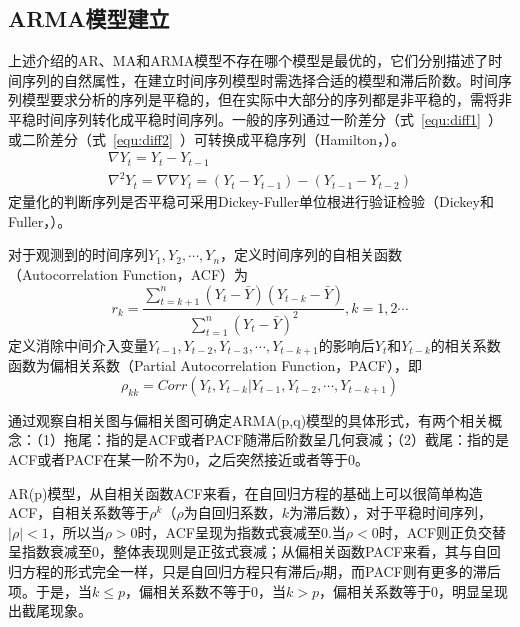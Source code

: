 \subsection{ARMA模型建立}
\label{chap:armamodelbuilding}

上述介绍的AR、MA和ARMA模型不存在哪个模型是最优的，它们分别描述了时间序列的自然属性，在建立时间序列模型时需选择合适的模型和滞后阶数。时间序列模型要求分析的序列是平稳的，但在实际中大部分的序列都是非平稳的，需将非平稳时间序列转化成平稳时间序列。一般的序列通过一阶差分（式~\ref{equ:diff1}~）或二阶差分（式~\ref{equ:diff2}~）可转换成平稳序列（Hamilton，\citeyear{hamilton1994time}）。
\begin{gather}
	\label{equ:diff1}
	\nabla {{Y}_{t}}={{Y}_{t}}-{{Y}_{t-1}} \\ 
	\label{equ:diff2}
	{{\nabla }^{2}}{{Y}_{t}}=\nabla \nabla {{Y}_{t}}=({{Y}_{t}}-{{Y}_{t-1}})-({{Y}_{t-1}}-{{Y}_{t-2}}) 
\end{gather}
定量化的判断序列是否平稳可采用Dickey-Fuller单位根进行验证检验（Dickey和Fuller，\citeyear{dickey1979distribution}）。

对于观测到的时间序列${{Y}_{1}},{{Y}_{2}},\cdots ,{{Y}_{n}}$，定义时间序列的自相关函数（Autocorrelation Function，ACF）为
\begin{equation}
	{{r}_{k}}=\frac{\sum\limits_{t=k+1}^{n}{({{Y}_{t}}-\bar{Y})({{Y}_{t-k}}-\bar{Y})}}{\sum\limits_{t=1}^{n}{{{({{Y}_{t}}-\bar{Y})}^{2}}}},k=1,2\cdots 
\end{equation}
定义消除中间介入变量${{Y}_{t-1}},{{Y}_{t-2}},{{Y}_{t-3}},\cdots ,{{Y}_{t-k+1}}$的影响后$Y_t$和$Y_{t-k}$的相关系数函数为偏相关系数（Partial Autocorrelation Function，PACF），即
\begin{equation}
	{{\rho }_{kk}}=Corr({{Y}_{t}},{{Y}_{t-k}}|{{Y}_{t-1}},{{Y}_{t-2}},\cdots ,{{Y}_{t-k+1}})
\end{equation}

通过观察自相关图与偏相关图可确定ARMA(p,q)模型的具体形式，有两个相关概念：（1）拖尾：指的是ACF或者PACF随滞后阶数呈几何衰减；（2）截尾：指的是ACF或者PACF在某一阶不为0，之后突然接近或者等于0。

AR(p)模型，从自相关函数ACF来看，在自回归方程的基础上可以很简单构造ACF，自相关系数等于${{\rho }^{k}}$（${\rho }$为自回归系数，$k$为滞后数），对于平稳时间序列，$\left| \rho  \right|<1$，所以当${\rho }>0$时，ACF呈现为指数式衰减至0.当${\rho }<0$时，ACF则正负交替呈指数衰减至0，整体表现则是正弦式衰减；从偏相关函数PACF来看，其与自回归方程的形式完全一样，只是自回归方程只有滞后$p$期，而PACF则有更多的滞后项。于是，当$k\le p$，偏相关系数不等于0，当$k>p$，偏相关系数等于0，明显呈现出截尾现象。

